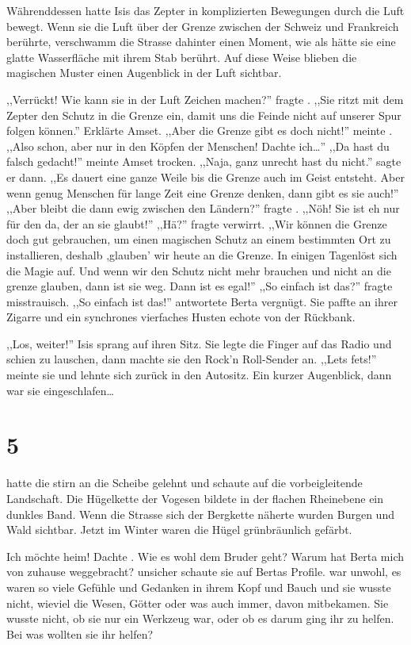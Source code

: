  Währenddessen hatte Isis das Zepter in komplizierten Bewegungen durch die Luft bewegt. Wenn sie die Luft über der Grenze zwischen der Schweiz und Frankreich berührte, verschwamm die Strasse dahinter einen Moment, wie als hätte sie eine glatte Wasserfläche mit ihrem Stab berührt. Auf diese Weise blieben die magischen Muster einen Augenblick in der Luft sichtbar. 
 
,,Verrückt! Wie kann sie in der Luft Zeichen machen?'' fragte \am . ,,Sie ritzt mit dem Zepter den Schutz in die Grenze ein, damit uns die Feinde nicht auf unserer Spur folgen können.'' Erklärte Amset. ,,Aber die Grenze gibt es doch nicht!'' meinte \am . ,,Also schon, aber nur in den Köpfen der Menschen! Dachte ich\dots '' ,,Da hast du falsch gedacht!'' meinte Amset trocken. ,,Naja, ganz unrecht hast du nicht.'' sagte er dann. ,,Es dauert eine ganze Weile bis die Grenze auch im Geist entsteht. Aber wenn genug Menschen für lange Zeit eine Grenze denken, dann gibt es sie auch!'' ,,Aber bleibt die dann ewig zwischen den Ländern?'' fragte \am . ,,Nöh! Sie ist eh nur für den da, der an sie glaubt!'' ,,Hä?'' fragte \am verwirrt. ,,Wir können die Grenze doch gut gebrauchen, um einen magischen Schutz an einem bestimmten Ort zu installieren, deshalb ,glauben' wir heute an die Grenze. In einigen Tagenlöst sich die Magie auf. Und wenn wir den Schutz nicht mehr brauchen und nicht an die grenze glauben, dann ist sie weg. Dann ist es egal!'' ,,So einfach ist das?'' fragte \am misstrauisch. ,,So einfach ist das!'' antwortete Berta vergnügt. Sie paffte an ihrer Zigarre und ein synchrones vierfaches Husten echote von der Rückbank.

,,Los, weiter!'' Isis sprang auf ihren Sitz. Sie legte die Finger auf das Radio und schien zu lauschen, dann machte sie den Rock'n Roll-Sender an. ,,Lets fets!'' meinte sie und lehnte sich zurück in den Autositz. Ein kurzer Augenblick, dann war sie eingeschlafen\dots

\section*{5}

\am hatte die stirn an die Scheibe gelehnt und schaute auf die vorbeigleitende Landschaft. Die Hügelkette der Vogesen bildete in der flachen Rheinebene ein dunkles Band. Wenn die Strasse sich der Bergkette näherte wurden Burgen und Wald sichtbar. Jetzt im Winter waren die Hügel grünbräunlich gefärbt.

Ich möchte heim! Dachte \am . Wie es wohl dem Bruder geht? Warum hat Berta mich von zuhause weggebracht? unsicher schaute sie auf Bertas Profile. \am war unwohl, es waren so viele Gefühle und Gedanken in ihrem Kopf und  Bauch und sie wusste nicht, wieviel die Wesen, Götter oder was auch immer, davon mitbekamen. Sie wusste nicht, ob sie nur ein Werkzeug war, oder ob es darum ging ihr zu helfen. Bei was wollten sie ihr helfen? 

